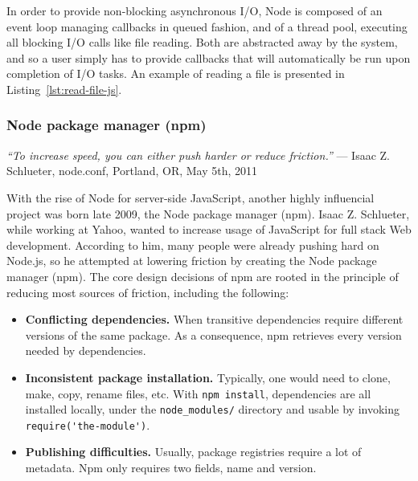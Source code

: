In order to provide non-blocking asynchronous I/O,
Node is composed of an event loop managing callbacks in queued fashion,
and of a thread pool, executing all blocking I/O calls like file reading.
Both are abstracted away by the system, and so a user simply has
to provide callbacks that will automatically be run upon completion of I/O tasks.
An example of reading a file is presented in Listing~\ref{lst:read-file-js}.




\subsubsection{Node package manager (\textsf{npm})}%
\label{ssub:node_package_manager_npm_}

\begin{displayquote}
	\textit{``To increase speed, you can either push harder or reduce friction.''}
	--- Isaac Z. Schlueter, node.conf, Portland, OR, May 5th, 2011
\end{displayquote}

With the rise of Node for server-side JavaScript,
another highly influencial project was born late 2009,
the Node package manager (\textsf{npm}).
Isaac Z. Schlueter, while working at Yahoo, wanted to increase usage
of JavaScript for full stack Web development.
According to him, many people were already pushing hard on Node.js,
so he attempted at lowering friction by creating the Node package manager (\textsf{npm}).
The core design decisions of \textsf{npm} are rooted in the principle of reducing
most sources of friction, including the following:

\begin{itemize}
	\item \textbf{Conflicting dependencies.}
		When transitive dependencies require different versions of the same package.
		As a consequence, \textsf{npm} retrieves every version needed by dependencies.
	\item \textbf{Inconsistent package installation.}
		Typically, one would need to clone, make, copy, rename files, etc.
		With \verb|npm install|, dependencies are all installed locally,
		under the \verb|node_modules/| directory and usable by invoking
		\verb|require('the-module')|.
	\item \textbf{Publishing difficulties.}
		Usually, package registries require a lot of metadata.
		\textsf{Npm} only requires two fields, name and version.
\end{itemize}

